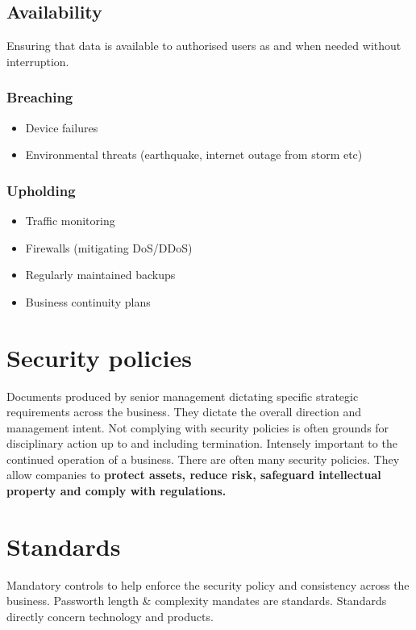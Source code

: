 \documentclass[12pt]{report}
\begin{document}
\subsection{Availability}
Ensuring that data is available to authorised users as and when needed without interruption.
\begin{multicols}{2}
\subsubsection{Breaching}
\begin{itemize}
	\item Device failures
	\item Environmental threats (earthquake, internet outage from storm etc)
\end{itemize}
\subsubsection{Upholding}
\begin{itemize}
	\item Traffic monitoring
	\item Firewalls (mitigating DoS/DDoS)
	\item Regularly maintained backups
	\item Business continuity plans
\end{itemize}
\end{multicols}
\pagebreak

\section{Security policies}
Documents produced by senior management dictating specific strategic requirements across the business. They dictate the overall direction and management intent. 
Not complying with security policies is often grounds for disciplinary action up to and including termination. Intensely important to the continued operation of a business.
There are often many security policies. They allow companies to \textbf{protect assets, reduce risk, safeguard intellectual property and comply with regulations.}

\section{Standards}
Mandatory controls to help enforce the security policy and consistency across the business. Passworth length \& complexity mandates are standards.
Standards directly concern technology and products.
\end{document}
